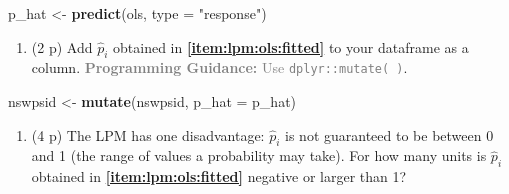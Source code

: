 \documentclass[
]{article}
\newenvironment{Shaded}{\begin{snugshade}}{\end{snugshade}}
\newcommand{\AttributeTok}[1]{\textcolor[rgb]{0.13,0.29,0.53}{#1}}
\newcommand{\CommentTok}[1]{\textcolor[rgb]{0.56,0.35,0.01}{\textit{#1}}}
\newcommand{\DecValTok}[1]{\textcolor[rgb]{0.00,0.00,0.81}{#1}}
\newcommand{\FunctionTok}[1]{\textcolor[rgb]{0.13,0.29,0.53}{\textbf{#1}}}
\newcommand{\NormalTok}[1]{#1}
\newcommand{\OtherTok}[1]{\textcolor[rgb]{0.56,0.35,0.01}{#1}}
\newcommand{\SpecialCharTok}[1]{\textcolor[rgb]{0.81,0.36,0.00}{\textbf{#1}}}
\newcommand{\StringTok}[1]{\textcolor[rgb]{0.31,0.60,0.02}{#1}}
\providecommand{\tightlist}{%
  \setlength{\itemsep}{0pt}\setlength{\parskip}{0pt}}
\begin{document}
\begin{enumerate}
\begin{Shaded}
\begin{Highlighting}[]
\NormalTok{p\_hat }\OtherTok{\textless{}{-}} \FunctionTok{predict}\NormalTok{(ols, }\AttributeTok{type =} \StringTok{"response"}\NormalTok{)}
\end{Highlighting}
\end{Shaded}

  \begin{enumerate}
  \def\labelenumii{\alph{enumii}.}
  \setcounter{enumii}{3}
  \tightlist
  \item
    (2 p) Add \(\hat{p}_i\) obtained in
    \textbf{\ref{item:lpm:ols:fitted}} to your dataframe as a column.
    \textcolor{gray}{\textbf{Programming Guidance:} Use \texttt{dplyr::mutate( )}}.
  \end{enumerate}

\begin{Shaded}
\begin{Highlighting}[]
\NormalTok{nswpsid }\OtherTok{\textless{}{-}} \FunctionTok{mutate}\NormalTok{(nswpsid, }\AttributeTok{p\_hat =}\NormalTok{ p\_hat)}
\end{Highlighting}
\end{Shaded}

  \begin{enumerate}
  \def\labelenumii{\alph{enumii}.}
  \setcounter{enumii}{4}
  \tightlist
  \item
    (4 p) The LPM has one disadvantage: \(\hat{p}_i\) is not guaranteed
    to be between 0 and 1 (the range of values a probability may take).
    For how many units is \(\hat{p}_i\) obtained in
    \textbf{\ref{item:lpm:ols:fitted}} negative or larger than 1?
  \end{enumerate}

\begin{Shaded}
\end{Shaded}


\end{enumerate}
\end{document}
